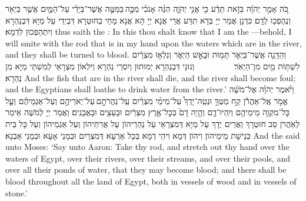 {כֹּ֚ה אָמַ֣ר יְהֹוָ֔ה בְּזֹ֣את תֵּדַ֔ע כִּ֖י אֲנִ֣י יְהֹוָ֑ה הִנֵּ֨ה אָנֹכִ֜י מַכֶּ֣ה \legarmeh  בַּמַּטֶּ֣ה אֲשֶׁר־בְּיָדִ֗י עַל־הַמַּ֛יִם אֲשֶׁ֥ר בַּיְאֹ֖ר וְנֶהֶפְכ֥וּ לְדָֽם׃
}
{כִּדְנָן אֲמַר יְיָ בְּדָא תִדַּע אֲרֵי אֲנָא יְיָ הָא אֲנָא מָחֵי בְחוּטְרָא דִּבְיְדִי עַל מַיָּא דִּבְנַהְרָא וְיִתְהַפְכוּן לִדְמָא׃}
{thus saith the \lord: In this thou shalt know that I am the \lord—behold, I will smite with the rod that is in my hand upon the waters which are in the river, and they shall be turned to blood.}{}
{וְהַדָּגָ֧ה אֲשֶׁר־בַּיְאֹ֛ר תָּמ֖וּת וּבָאַ֣שׁ הַיְאֹ֑ר וְנִלְא֣וּ מִצְרַ֔יִם לִשְׁתּ֥וֹת מַ֖יִם מִן־הַיְאֹֽר׃ \setuma         
}
{וְנוּנֵי דִּבְנַהְרָא יְמוּתוּן וְיִסְרֵי נַהְרָא וְיִלְאוֹן מִצְרָאֵי לְמִשְׁתֵּי מַיָּא מִן נַהְרָא׃}
{And the fish that are in the river shall die, and the river shall become foul; and the Egyptians shall loathe to drink water from the river.’}{}
{וַיֹּ֨אמֶר יְהֹוָ֜ה אֶל־מֹשֶׁ֗ה אֱמֹ֣ר אֶֽל־אַהֲרֹ֡ן קַ֣ח מַטְּךָ֣ וּנְטֵֽה־יָדְךָ֩ עַל־מֵימֵ֨י מִצְרַ֜יִם עַֽל־נַהֲרֹתָ֣ם \legarmeh  עַל־יְאֹרֵיהֶ֣ם וְעַל־אַגְמֵיהֶ֗ם וְעַ֛ל כׇּל־מִקְוֵ֥ה מֵימֵיהֶ֖ם וְיִֽהְיוּ־דָ֑ם וְהָ֤יָה דָם֙ בְּכׇל־אֶ֣רֶץ מִצְרַ֔יִם וּבָעֵצִ֖ים וּבָאֲבָנִֽים׃
}
{וַאֲמַר יְיָ לְמֹשֶׁה אֵימַר לְאַהֲרֹן סַב חוּטְרָךְ וַאֲרֵים יְדָךְ עַל מַיָּא דְּמִצְרָאֵי עַל נַהְרֵיהוֹן עַל אֲרִתֵּיהוֹן וְעַל אַגְמֵיהוֹן וְעַל כָּל בֵּית כְּנֵישָׁת מֵימֵיהוֹן וִיהוֹן דְּמָא וִיהֵי דְמָא בְּכָל אַרְעָא דְּמִצְרַיִם וּבְמָנֵי אָעָא וּבְמָנֵי אַבְנָא׃}
{And the \lord\space said unto Moses: ‘Say unto Aaron: Take thy rod, and stretch out thy hand over the waters of Egypt, over their rivers, over their streams, and over their pools, and over all their ponds of water, that they may become blood; and there shall be blood throughout all the land of Egypt, both in vessels of wood and in vessels of stone.’}{}
